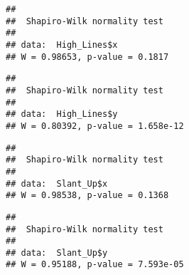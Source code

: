 \documentclass[
]{article}
\newenvironment{Shaded}{\begin{snugshade}}{\end{snugshade}}
\newcommand{\FunctionTok}[1]{\textcolor[rgb]{0.13,0.29,0.53}{\textbf{#1}}}
\newcommand{\NormalTok}[1]{#1}
\newcommand{\OtherTok}[1]{\textcolor[rgb]{0.56,0.35,0.01}{#1}}
\newcommand{\SpecialCharTok}[1]{\textcolor[rgb]{0.81,0.36,0.00}{\textbf{#1}}}
\newcommand{\StringTok}[1]{\textcolor[rgb]{0.31,0.60,0.02}{#1}}
\begin{document}
\begin{verbatim}
## 
##  Shapiro-Wilk normality test
## 
## data:  High_Lines$x
## W = 0.98653, p-value = 0.1817
\end{verbatim}

\begin{Shaded}
\end{Shaded}

\begin{verbatim}
## 
##  Shapiro-Wilk normality test
## 
## data:  High_Lines$y
## W = 0.80392, p-value = 1.658e-12
\end{verbatim}

\begin{Shaded}
\end{Shaded}

\begin{verbatim}
## 
##  Shapiro-Wilk normality test
## 
## data:  Slant_Up$x
## W = 0.98538, p-value = 0.1368
\end{verbatim}

\begin{Shaded}
\end{Shaded}

\begin{verbatim}
## 
##  Shapiro-Wilk normality test
## 
## data:  Slant_Up$y
## W = 0.95188, p-value = 7.593e-05
\end{verbatim}

\begin{Shaded}
\end{Shaded}
\end{document}
